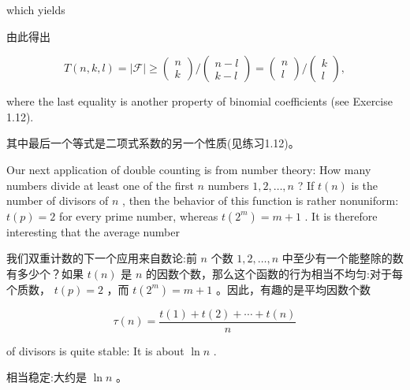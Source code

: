 \documentclass[10pt]{article}
\begin{document}
which yields

\begin{tcolorbox}\relax
由此得出
\end{tcolorbox}

\[
T\left( {n,k,l}\right)  = \left| \mathcal{F}\right|  \geq  \left( \begin{array}{l} n \\  k \end{array}\right) /\left( \begin{array}{l} n - l \\  k - l \end{array}\right)  = \left( \begin{array}{l} n \\  l \end{array}\right) /\left( \begin{array}{l} k \\  l \end{array}\right) ,
\]

where the last equality is another property of binomial coefficients (see Exercise 1.12).

\begin{tcolorbox}\relax
其中最后一个等式是二项式系数的另一个性质(见练习1.12)。
\end{tcolorbox}

Our next application of double counting is from number theory: How many numbers divide at least one of the first \(n\) numbers \(1,2,\ldots ,n\) ? If \(t\left( n\right)\) is the number of divisors of \(n\) , then the behavior of this function is rather nonuniform: \(t\left( p\right)  = 2\) for every prime number, whereas \(t\left( {2}^{m}\right)  = m + 1\) . It is therefore interesting that the average number

\begin{tcolorbox}\relax
我们双重计数的下一个应用来自数论:前 \(n\) 个数 \(1,2,\ldots ,n\) 中至少有一个能整除的数有多少个？如果 \(t\left( n\right)\) 是 \(n\) 的因数个数，那么这个函数的行为相当不均匀:对于每个质数， \(t\left( p\right)  = 2\) ，而 \(t\left( {2}^{m}\right)  = m + 1\) 。因此，有趣的是平均因数个数
\end{tcolorbox}

\[
\tau \left( n\right)  = \frac{t\left( 1\right)  + t\left( 2\right)  + \cdots  + t\left( n\right) }{n}
\]

of divisors is quite stable: It is about \(\ln n\) .

\begin{tcolorbox}\relax
相当稳定:大约是 \(\ln n\) 。
\end{tcolorbox}
\end{document}
